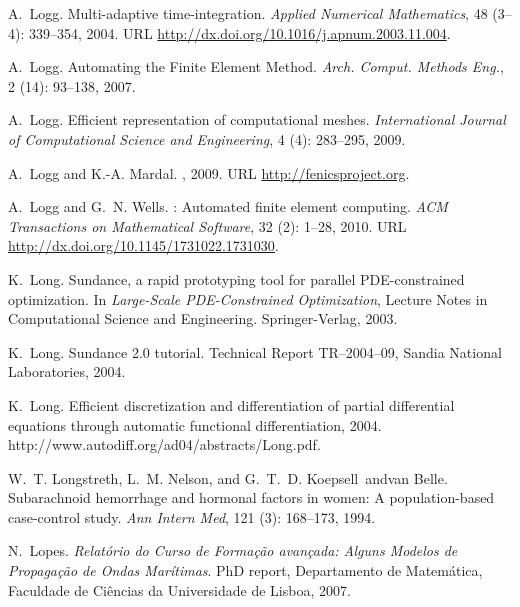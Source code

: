 \begin{thebibliography}{467}
A.~Logg.
\newblock Multi-adaptive time-integration.
\newblock \emph{Applied Numerical Mathematics}, 48 (3--4):
  339--354, 2004.
\newblock URL \url{http://dx.doi.org/10.1016/j.apnum.2003.11.004}.

A.~Logg.
\newblock Automating the Finite Element Method.
\newblock \emph{Arch. Comput. Methods Eng.}, 2 (14): 93--138, 2007.

A.~Logg.
\newblock Efficient representation of computational meshes.
\newblock \emph{International Journal of Computational Science and
  Engineering}, 4 (4): 283--295, 2009.

A.~Logg and K.-A. Mardal.
, 2009.
\newblock URL \url{http://fenicsproject.org}.

A.~Logg and G.~N. Wells.
: {A}utomated finite element computing.
\newblock \emph{ACM Transactions on Mathematical Software}, 32
  (2): 1--28, 2010.
\newblock URL \url{http://dx.doi.org/10.1145/1731022.1731030}.

K.~Long.
\newblock Sundance, a rapid prototyping tool for parallel {PDE}-constrained
  optimization.
\newblock In \emph{Large-Scale PDE-Constrained Optimization}, Lecture Notes in
  Computational Science and Engineering. Springer-Verlag, 2003.

K.~Long.
\newblock Sundance 2.0 tutorial.
\newblock Technical Report TR--2004--09, Sandia National Laboratories,
  2004{}.

K.~Long.
\newblock Efficient discretization and differentiation of partial differential
  equations through automatic functional differentiation, 2004{}.
\newblock http://www.autodiff.org/ad04/abstracts/Long.pdf.

W.~T. Longstreth, L.~M. Nelson, and G.~T.~D. Koepsell~andvan Belle.
\newblock Subarachnoid hemorrhage and hormonal factors in women: {A}
  population-based case-control study.
\newblock \emph{Ann Intern Med}, 121 (3): 168--173, 1994.

N.~Lopes.
\newblock \emph{{R}elat\'{o}rio do Curso de Forma\c{c}\~{a}o avan\c{c}ada:
  Alguns Modelos de Propaga\c{c}\~{a}o de Ondas Mar\'{i}timas}.
\newblock PhD report, Departamento de Matem\'{a}tica, Faculdade de Ci\^{e}ncias
  da Universidade de Lisboa, 2007.


\end{thebibliography}
